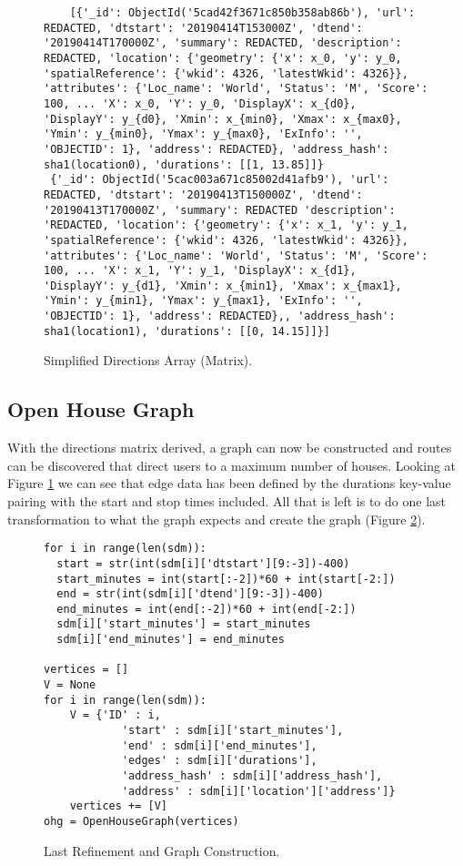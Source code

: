 \documentclass[letterpaper,11pt]{report}
\theoremstyle{definition}
\theoremstyle{definition}
\begin{document}
\begin{figure}[!htb]
  \begin{lstlisting}
    [{'_id': ObjectId('5cad42f3671c850b358ab86b'), 'url': REDACTED, 'dtstart': '20190414T153000Z', 'dtend': '20190414T170000Z', 'summary': REDACTED, 'description': REDACTED, 'location': {'geometry': {'x': x_0, 'y': y_0, 'spatialReference': {'wkid': 4326, 'latestWkid': 4326}}, 'attributes': {'Loc_name': 'World', 'Status': 'M', 'Score': 100, ... 'X': x_0, 'Y': y_0, 'DisplayX': x_{d0}, 'DisplayY': y_{d0}, 'Xmin': x_{min0}, 'Xmax': x_{max0}, 'Ymin': y_{min0}, 'Ymax': y_{max0}, 'ExInfo': '', 'OBJECTID': 1}, 'address': REDACTED}, 'address_hash': sha1(location0), 'durations': [[1, 13.85]]}
 {'_id': ObjectId('5cac003a671c85002d41afb9'), 'url': REDACTED, 'dtstart': '20190413T150000Z', 'dtend': '20190413T170000Z', 'summary': REDACTED 'description': 'REDACTED, 'location': {'geometry': {'x': x_1, 'y': y_1, 'spatialReference': {'wkid': 4326, 'latestWkid': 4326}}, 'attributes': {'Loc_name': 'World', 'Status': 'M', 'Score': 100, ... 'X': x_1, 'Y': y_1, 'DisplayX': x_{d1}, 'DisplayY': y_{d1}, 'Xmin': x_{min1}, 'Xmax': x_{max1}, 'Ymin': y_{min1}, 'Ymax': y_{max1}, 'ExInfo': '', 'OBJECTID': 1}, 'address': REDACTED},, 'address_hash': sha1(location1), 'durations': [[0, 14.15]]}]
  \end{lstlisting}
  \caption{Simplified Directions Array (Matrix).}\label{simplified directions array}
\end{figure}

 \subsection{Open House Graph}
 With the directions matrix derived, a graph can now be constructed and routes can be discovered that direct users to a maximum number of houses. Looking at Figure \ref{simplified directions array} we can see that edge data has been defined by the \textsf{durations} key-value pairing with the start and stop times included. All that is left is to do one last transformation to what the graph expects and create the graph (Figure \ref{last refinement}).
 \begin{figure}[!htb]
   \begin{lstlisting}
for i in range(len(sdm)):
  start = str(int(sdm[i]['dtstart'][9:-3])-400)
  start_minutes = int(start[:-2])*60 + int(start[-2:])
  end = str(int(sdm[i]['dtend'][9:-3])-400)
  end_minutes = int(end[:-2])*60 + int(end[-2:])
  sdm[i]['start_minutes'] = start_minutes
  sdm[i]['end_minutes'] = end_minutes

vertices = []
V = None
for i in range(len(sdm)):
    V = {'ID' : i, 
            'start' : sdm[i]['start_minutes'], 
            'end' : sdm[i]['end_minutes'], 
            'edges' : sdm[i]['durations'],
            'address_hash' : sdm[i]['address_hash'],
            'address' : sdm[i]['location']['address']}
    vertices += [V]
ohg = OpenHouseGraph(vertices)
   \end{lstlisting}
   \caption{Last Refinement and Graph Construction.}\label{last refinement}
  \end{figure}
\end{document}
